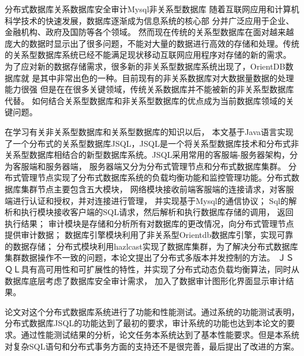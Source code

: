 
\begin{Cabstract}{分布式数据库}{关系数据库}{安全审计}{Mysql}{非关系型数据库}
随着互联网应用和计算机科学技术的快速发展，数据库逐渐成为信息系统的核心部
分并广泛应用于企业、金融机构、政府及国防等各个领域。
然而现在传统的关系型数据库在面对越来越庞大的数据时显示出了很多问题，不能对大量的数据进行高效的存储和处理。传统的关系型数据库系统已经不能满足现状移动互联网应用程序对存储的新的需求。
为了应对新的数据存储需求，很多新的非关系型数据库系统出现了，OrientDB数据库就
是其中非常出色的一种。目前现有的非关系数据库对大数据量数据的处理能力很强
但是在在很多关键领域，传统关系数据库并不能被新的非关系型数据库代替。
如何结合关系型数据库和非关系型数据库的优点成为当前数据库领域的关键问题。

在学习有关非关系型数据库和关系型数据库的知识以后，
本文基于Java语言实现了一个分布式的关系型数据库JSQL，JSQL是一个将关系型数据库技术和分布式非关系型数据库相结合的新型数据库系统。JSQL采用常用的客服端-服务器架构，分为客服端和服务器端，
服务器端又分为分布式管理节点和分布式数据库集群。
分布式管理节点实现了分布式数据库系统的负载均衡功能和监控管理功能。分布式数据库集群节点主要包含五大模块，
网络模块接收前端客服端的连接请求，对客服端进行认证和授权，并对连接进行管理，
并实现基于Mysql的通信协议；
Sql的解析和执行模块接收客户端的SQL请求，然后解析和执行数据库存储的调用，
返回执行结果；
审计模块是存储和分析所有对数据库的更改情况，向分布式管理节点提供审计数据；
数据库引擎模块利用了非关系型Orientdb数据库引擎，实现可靠的数据存储；
分布式模块利用hazlcast实现了数据库集群，为了解决分布式数据库集群数据操作不一致的问题，本论文提出了分布式多版本并发控制的方法。
ＪＳＱＬ具有高可用性和可扩展性的特性，并实现了分布式动态负载均衡算法，同时从数据库底层考虑了数据库安全审计需求，
加入了数据审计图形化界面显示审计结果。

论文对这个分布式数据库系统进行了功能和性能测试。通过系统的功能测试表明，分布式数据库JSQL的功能达到了最初的要求，审计系统的功能也达到本论文的要求。通过性能测试结果的分析，论文任务本系统达到了基本性能要求。但是本系统对复杂SQL语句和分布式事务方面的支持还不是很完善，最后提出了改进的方案。
\end{Cabstract}